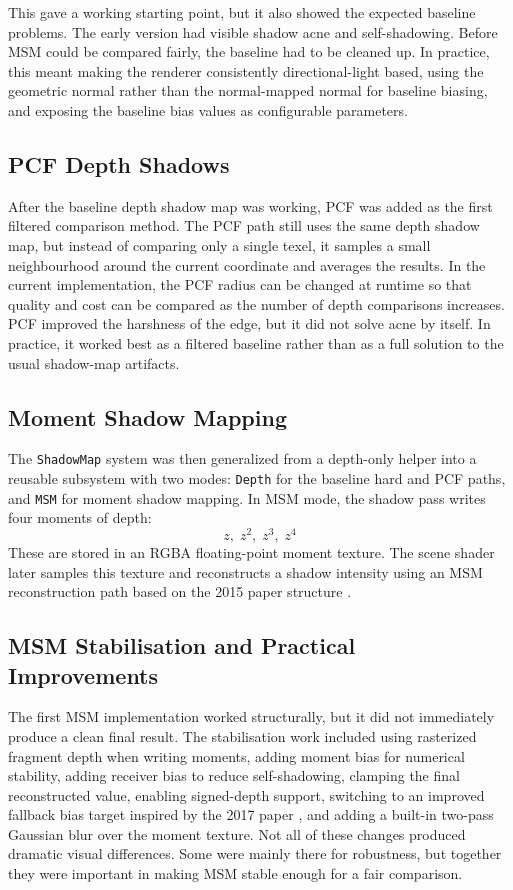 This gave a working starting point, but it also showed the expected baseline problems. The early version had visible shadow acne and self-shadowing. Before MSM could be compared fairly, the baseline had to be cleaned up. In practice, this meant making the renderer consistently directional-light based, using the geometric normal rather than the normal-mapped normal for baseline biasing, and exposing the baseline bias values as configurable parameters.

\subsection{PCF Depth Shadows}

After the baseline depth shadow map was working, PCF was added as the first filtered comparison method. The PCF path still uses the same depth shadow map, but instead of comparing only a single texel, it samples a small neighbourhood around the current coordinate and averages the results. In the current implementation, the PCF radius can be changed at runtime so that quality and cost can be compared as the number of depth comparisons increases. PCF improved the harshness of the edge, but it did not solve acne by itself. In practice, it worked best as a filtered baseline rather than as a full solution to the usual shadow-map artifacts.

\subsection{Moment Shadow Mapping}

The \texttt{ShadowMap} system was then generalized from a depth-only helper into a reusable subsystem with two modes: \texttt{Depth} for the baseline hard and PCF paths, and \texttt{MSM} for moment shadow mapping. In MSM mode, the shadow pass writes four moments of depth:
\[
z,\; z^2,\; z^3,\; z^4
\]
These are stored in an RGBA floating-point moment texture. The scene shader later samples this texture and reconstructs a shadow intensity using an MSM reconstruction path based on the 2015 paper structure \cite{peters2015msm}.

\subsection{MSM Stabilisation and Practical Improvements}

The first MSM implementation worked structurally, but it did not immediately produce a clean final result. The stabilisation work included using rasterized fragment depth when writing moments, adding moment bias for numerical stability, adding receiver bias to reduce self-shadowing, clamping the final reconstructed value, enabling signed-depth support, switching to an improved fallback bias target inspired by the 2017 paper \cite{peters2017improved}, and adding a built-in two-pass Gaussian blur over the moment texture. Not all of these changes produced dramatic visual differences. Some were mainly there for robustness, but together they were important in making MSM stable enough for a fair comparison.


